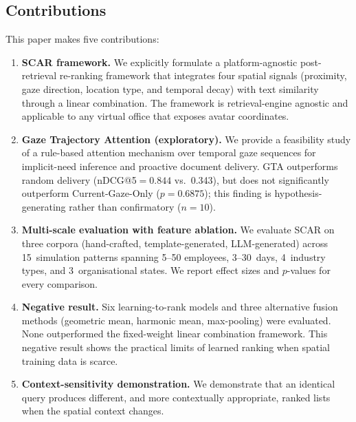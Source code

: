\documentclass[journal]{IEEEtran}
\begin{document}
\subsection{Contributions}
\label{sec:intro_contributions}

This paper makes five contributions:

\begin{enumerate}
  \item[\textbf{C1.}] \textbf{SCAR framework.}  We explicitly
        formulate a platform-agnostic post-retrieval re-ranking
        framework that integrates four spatial signals (proximity,
        gaze direction, location type, and temporal decay) with
        text similarity through a linear combination.
        The framework is retrieval-engine agnostic and applicable to
        any virtual office that exposes avatar coordinates.

  \item[\textbf{C2.}] \textbf{Gaze Trajectory Attention
        (exploratory).}  We provide a feasibility study of a
        rule-based attention mechanism over temporal gaze sequences
        for implicit-need inference and proactive document delivery.
        GTA outperforms random delivery (nDCG@5${}=0.844$ vs.\ 0.343),
        but does not significantly outperform Current-Gaze-Only
        ($p{=}0.6875$); this finding is hypothesis-generating rather
        than confirmatory ($n{=}10$).

  \item[\textbf{C3.}] \textbf{Multi-scale evaluation with feature
        ablation.}  We evaluate SCAR on three corpora (hand-crafted,
        template-generated, LLM-generated) across 15~simulation
        patterns spanning 5--50 employees, 3--30~days, 4~industry
        types, and 3~organisational states.  We report effect sizes
        and $p$-values for every comparison.

  \item[\textbf{C4.}] \textbf{Negative result.}  Six
        learning-to-rank models and three alternative fusion
        methods (geometric mean, harmonic mean, max-pooling) were
        evaluated.  None outperformed the fixed-weight linear
        combination framework.  This negative result shows the practical limits of
        learned ranking when spatial training data is scarce.

  \item[\textbf{C5.}] \textbf{Context-sensitivity demonstration.}
        We demonstrate that an identical query produces
        different, and more contextually appropriate, ranked lists
        when the spatial context changes.
\end{enumerate}
\end{document}
